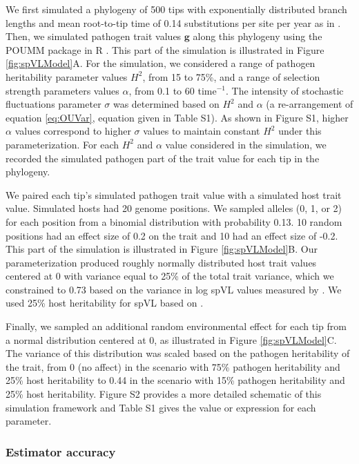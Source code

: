 \documentclass[11pt]{article}
\begin{document}
\begin{linenumbers}
We first simulated a phylogeny of 500 tips with exponentially distributed branch lengths and mean root-to-tip time of 0.14 substitutions per site per year as in \cite{Hodcroft2014}. Then, we simulated pathogen trait values $\bm{g}$ along this phylogeny using the POUMM package in R \citep{Mitov2017a-POUMM}. This part of the simulation is illustrated in Figure \ref{fig:spVLModel}A. For the simulation, we considered a range of pathogen heritability parameter values $H^2$, from 15 to 75\%, and a range of selection strength parameters values $\alpha$, from 0.1 to 60 time$^{-1}$. The intensity of stochastic fluctuations parameter $\sigma$ was determined based on $H^2$ and $\alpha$ (a re-arrangement of equation \ref{eq:OUVar}, equation given in Table S1). As shown in Figure S1, higher $\alpha$ values correspond to higher $\sigma$ values to maintain constant $H^2$ under this parameterization. For each $H^2$ and $\alpha$ value considered in the simulation, we recorded the simulated pathogen part of the trait value for each tip in the phylogeny.

We paired each tip's simulated pathogen trait value with a simulated host trait value. Simulated hosts had 20 genome positions. We sampled alleles (0, 1, or 2) for each position from a binomial distribution with probability 0.13. 10 random positions had an effect size of 0.2 on the trait and 10 had an effect size of -0.2. This part of the simulation is illustrated in Figure \ref{fig:spVLModel}B. Our parameterization produced roughly normally distributed host trait values centered at 0 with variance equal to 25\% of the total trait variance, which we constrained to 0.73 based on the variance in log spVL values measured by \cite{Mitov2018}. We used 25\% host heritability for spVL based on \cite{McLaren2015}.

Finally, we sampled an additional random environmental effect for each tip from a normal distribution centered at 0, as illustrated in Figure \ref{fig:spVLModel}C. The variance of this distribution was scaled based on the pathogen heritability of the trait, from 0 (no affect) in the scenario with 75\% pathogen heritability and 25\% host heritability to 0.44 in the scenario with 15\% pathogen heritability and 25\% host heritability. Figure S2 provides a more detailed schematic of this simulation framework and Table S1 gives the value or expression for each parameter.

\subsubsection*{Estimator accuracy}


\end{linenumbers}
\end{document}
